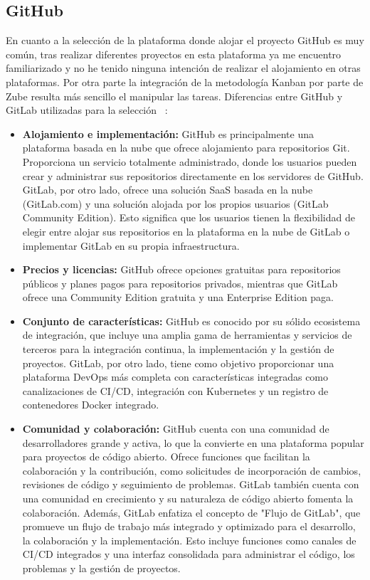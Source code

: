 \subsection{GitHub}
En cuanto a la selección de la plataforma donde alojar el proyecto GitHub es muy común, tras realizar diferentes proyectos en esta plataforma ya me encuentro familiarizado y no he tenido ninguna intención de realizar el alojamiento en otras plataformas. Por otra parte la integración de la metodología Kanban por parte de Zube resulta más sencillo el manipular las tareas.
Diferencias entre GitHub y GitLab utilizadas para la selección ~\cite{GitHub-GitLab}:
\begin{itemize}
    \item \textbf{Alojamiento e implementación:} GitHub es principalmente una plataforma basada en la nube que ofrece alojamiento para repositorios Git. Proporciona un servicio totalmente administrado, donde los usuarios pueden crear y administrar sus repositorios directamente en los servidores de GitHub. GitLab, por otro lado, ofrece una solución SaaS basada en la nube (GitLab.com) y una solución alojada por los propios usuarios (GitLab Community Edition). Esto significa que los usuarios tienen la flexibilidad de elegir entre alojar sus repositorios en la plataforma en la nube de GitLab o implementar GitLab en su propia infraestructura.
    \item \textbf{Precios y licencias:} GitHub ofrece opciones gratuitas para repositorios públicos y planes pagos para repositorios privados, mientras que GitLab ofrece una Community Edition gratuita y una Enterprise Edition paga.
    \item \textbf{Conjunto de características:} GitHub es conocido por su sólido ecosistema de integración, que incluye una amplia gama de herramientas y servicios de terceros para la integración continua, la implementación y la gestión de proyectos. GitLab, por otro lado, tiene como objetivo proporcionar una plataforma DevOps más completa con características integradas como canalizaciones de CI/CD, integración con Kubernetes y un registro de contenedores Docker integrado.
    \item \textbf{Comunidad y colaboración:} GitHub cuenta con una comunidad de desarrolladores grande y activa, lo que la convierte en una plataforma popular para proyectos de código abierto. Ofrece funciones que facilitan la colaboración y la contribución, como solicitudes de incorporación de cambios, revisiones de código y seguimiento de problemas. GitLab también cuenta con una comunidad en crecimiento y su naturaleza de código abierto fomenta la colaboración. Además, GitLab enfatiza el concepto de "Flujo de GitLab", que promueve un flujo de trabajo más integrado y optimizado para el desarrollo, la colaboración y la implementación. Esto incluye funciones como canales de CI/CD integrados y una interfaz consolidada para administrar el código, los problemas y la gestión de proyectos.
\end{itemize}

